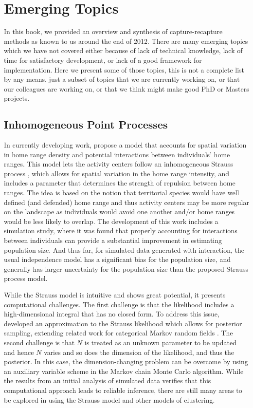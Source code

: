 \section{Emerging Topics}

In this book, we provided an overview and synthesis of
capture-recapture methods as known to us around the end of 2012. There
are many emerging topics which we have not covered either because of
lack of technical knowledge, lack of time for satisfactory
development, or lack of a good framework for implementation. Here we
present some of those topics, this is not a complete list by any means,
just a subset of topics that we are currently working on,
or that our colleagues are working on, or that we think 
might make good PhD or Masters projects.



\subsection{Inhomogeneous Point Processes}
\label{last.sec.ipp}

In currently developing work, \citet{reich_etal:2012} propose a model
that accounts for spatial variation in home range density and
potential interactions between individuals' home ranges. This model
lets the activity centers follow an inhomogeneous Strauss process
\citep{strauss:1975}, which allows for spatial variation in the home
range intensity, and includes a parameter that determines the strength
of repulsion between home ranges. The idea is based on the notion
that territorial species would have well defined (and defended) home
range and thus activity centers may be more regular on the landscape
as individuals would avoid one another and/or home ranges would be
less likely to overlap. The development of this work includes a
simulation study, where it was found that properly accounting for
interactions between individuals can provide a substantial improvement
in estimating population size. And thus far, for simulated data
generated with interaction, the usual independence model has a
significant bias for the population size, and generally has larger
uncertainty for the population size than the proposed Strauss process
model.

While the Strauss model is intuitive and shows great potential, it
presents computational challenges. The first challenge is that the
likelihood includes a high-dimensional integral that has no closed
form. To address this issue, \citet{reich_etal:2012} developed an
approximation to the Strauss likelihood which allows for posterior
sampling, extending related work for categorical Markov random fields
\citep{green_richardson:2002,smith_smith:2006}. The second challenge
is that $N$ is treated as an unknown parameter to be updated and hence
$N$ varies and so does the dimension of the likelihood, and thus the
posterior. In this case, the dimension-changing problem can be
overcome by using an auxiliary variable scheme in the Markov chain
Monte Carlo algorithm.
While the results from an initial analysis of simulated data verifies
that this computational approach leads to reliable inference, there
are still many areas to be explored in using the Strauss model and
other models of clustering.


